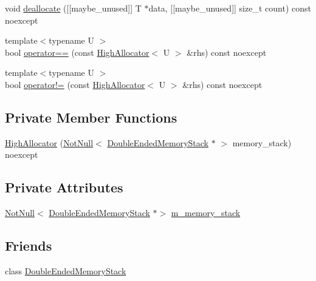\begin{DoxyCompactItemize}
\item 
void \mbox{\hyperlink{classmage_1_1_double_ended_memory_stack_1_1_high_allocator_a55d69749cc07e9486df215f77d7619f6}{deallocate}} (\mbox{[}\mbox{[}maybe\+\_\+unused\mbox{]}\mbox{]} T $\ast$data, \mbox{[}\mbox{[}maybe\+\_\+unused\mbox{]}\mbox{]} size\+\_\+t count) const noexcept
\item 
{\footnotesize template$<$typename U $>$ }\\bool \mbox{\hyperlink{classmage_1_1_double_ended_memory_stack_1_1_high_allocator_afb9cebad6705d90479185c6a7932c657}{operator==}} (const \mbox{\hyperlink{classmage_1_1_double_ended_memory_stack_1_1_high_allocator}{High\+Allocator}}$<$ U $>$ \&rhs) const noexcept
\item 
{\footnotesize template$<$typename U $>$ }\\bool \mbox{\hyperlink{classmage_1_1_double_ended_memory_stack_1_1_high_allocator_a4e6823ef7853c905a99f2f59847aeea0}{operator!=}} (const \mbox{\hyperlink{classmage_1_1_double_ended_memory_stack_1_1_high_allocator}{High\+Allocator}}$<$ U $>$ \&rhs) const noexcept
\end{DoxyCompactItemize}
\subsection*{Private Member Functions}
\begin{DoxyCompactItemize}
\item 
\mbox{\hyperlink{classmage_1_1_double_ended_memory_stack_1_1_high_allocator_a4be3d4cac75c3bd8088d47c0ec06cf11}{High\+Allocator}} (\mbox{\hyperlink{namespacemage_a8769f9d670d6b585ea306cb1062af94b}{Not\+Null}}$<$ \mbox{\hyperlink{classmage_1_1_double_ended_memory_stack}{Double\+Ended\+Memory\+Stack}} $\ast$ $>$ memory\+\_\+stack) noexcept
\end{DoxyCompactItemize}
\subsection*{Private Attributes}
\begin{DoxyCompactItemize}
\item 
\mbox{\hyperlink{namespacemage_a8769f9d670d6b585ea306cb1062af94b}{Not\+Null}}$<$ \mbox{\hyperlink{classmage_1_1_double_ended_memory_stack}{Double\+Ended\+Memory\+Stack}} $\ast$$>$ \mbox{\hyperlink{classmage_1_1_double_ended_memory_stack_1_1_high_allocator_a12f884e51fa8115f25eb0cc869d2d7a0}{m\+\_\+memory\+\_\+stack}}
\end{DoxyCompactItemize}
\subsection*{Friends}
\begin{DoxyCompactItemize}
\item 
class \mbox{\hyperlink{classmage_1_1_double_ended_memory_stack_1_1_high_allocator_a10ae729d55b8c0017057250445835680}{Double\+Ended\+Memory\+Stack}}
\end{DoxyCompactItemize}


